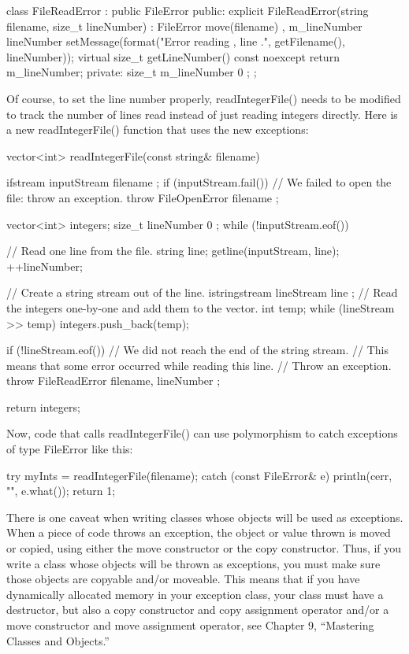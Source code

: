 \begin{cpp}
class FileReadError : public FileError
{
    public:
        explicit FileReadError(string filename, size_t lineNumber)
        : FileError { move(filename) }, m_lineNumber { lineNumber }
        {
            setMessage(format("Error reading {}, line {}.",
            getFilename(), lineNumber));
        }
        virtual size_t getLineNumber() const noexcept { return m_lineNumber; }
    private:
        size_t m_lineNumber { 0 };
};
\end{cpp}

Of course, to set the line number properly, readIntegerFile() needs to be modified to track the number of lines read instead of just reading integers directly. Here is a new readIntegerFile() function that uses the new exceptions:

\begin{cpp}
vector<int> readIntegerFile(const string& filename)
{
    ifstream inputStream { filename };
    if (inputStream.fail()) {
        // We failed to open the file: throw an exception.
        throw FileOpenError { filename };
    }

    vector<int> integers;
    size_t lineNumber { 0 };
    while (!inputStream.eof()) {
        // Read one line from the file.
        string line;
        getline(inputStream, line);
        ++lineNumber;

        // Create a string stream out of the line.
        istringstream lineStream { line };
        // Read the integers one-by-one and add them to the vector.
        int temp;
        while (lineStream >> temp) {
            integers.push_back(temp);
        }

        if (!lineStream.eof()) {
            // We did not reach the end of the string stream.
            // This means that some error occurred while reading this line.
            // Throw an exception.
            throw FileReadError { filename, lineNumber };
        }
    }
    return integers;
}
\end{cpp}

Now, code that calls readIntegerFile() can use polymorphism to catch exceptions of type FileError like this:

\begin{cpp}
try {
    myInts = readIntegerFile(filename);
} catch (const FileError& e) {
    println(cerr, "{}", e.what());
    return 1;
}
\end{cpp}

There is one caveat when writing classes whose objects will be used as exceptions. When a piece of code throws an exception, the object or value thrown is moved or copied, using either the move constructor or the copy constructor. Thus, if you write a class whose objects will be thrown as exceptions, you must make sure those objects are copyable and/or moveable. This means that if you have dynamically allocated memory in your exception class, your class must have a destructor, but also a copy constructor and copy assignment operator and/or a move constructor and move assignment operator, see Chapter 9, “Mastering Classes and Objects.”

